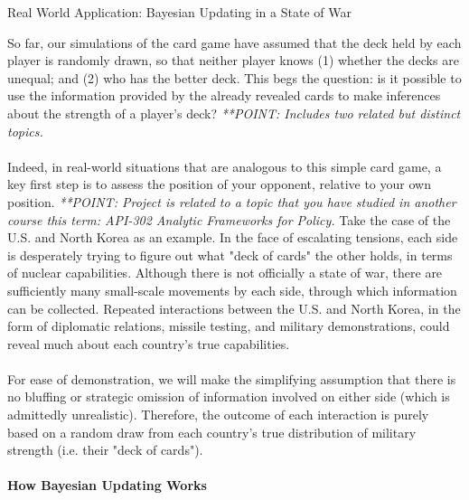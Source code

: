 \documentclass[12pt]{article}
\begin{document}
\begin{center}
Real World Application: Bayesian Updating in a State of War
\end{center}

\begin{itemize}
So far, our simulations of the card game have assumed that the deck held by each player is randomly drawn, so that neither player knows (1) whether the decks are unequal; and (2) who has the better deck. This begs the question: is it possible to use the information provided by the already revealed cards to make inferences about the strength of a player's deck? \textit{**POINT: Includes two related but distinct topics.}\\
\\
Indeed, in real-world situations that are analogous to this simple card game, a key first step is to assess the position of your opponent, relative to your own position. \textit{**POINT: Project is related to a topic that you have studied in another course this term: API-302 Analytic Frameworks for Policy.} Take the case of the U.S. and North Korea as an example. In the face of escalating tensions, each side is desperately trying to figure out what "deck of cards" the other holds, in terms of nuclear capabilities. Although there is not officially a state of war, there are sufficiently many small-scale movements by each side, through which information can be collected. Repeated interactions between the U.S. and North Korea, in the form of diplomatic relations, missile testing, and military demonstrations, could reveal much about each country's true capabilities.\\
\\
For ease of demonstration, we will make the simplifying assumption that there is no bluffing or strategic omission of information involved on either side (which is admittedly unrealistic). Therefore, the outcome of each interaction is purely based on a random draw from each country's true distribution of military strength (i.e. their "deck of cards").\\
\end{itemize}

\paragraph*{How Bayesian Updating Works}
\end{document}
